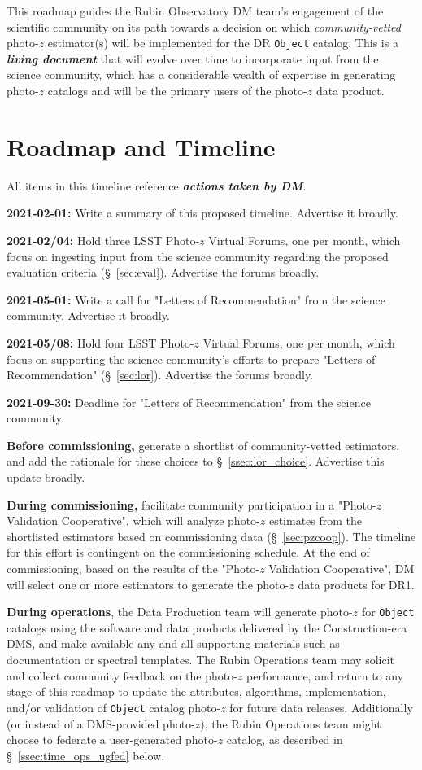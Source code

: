 \documentclass[DM,authoryear,toc]{lsstdoc}
\begin{document}
This roadmap guides the Rubin Observatory DM team's engagement of the scientific community on its path towards a decision on which \textit{community-vetted} photo-$z$ estimator(s) will be implemented for the DR {\tt Object} catalog.
This is a \textit{\textbf{living document}} that will evolve over time to incorporate input from the science community, which has a considerable wealth of expertise in generating photo-$z$ catalogs and will be the primary users of the photo-$z$ data product.


\section{Roadmap and Timeline}\label{sec:time}

All items in this timeline reference \textbf{\textit{actions taken by DM}}.

{\bf 2021-02-01:} Write a summary of this proposed timeline. Advertise it broadly.

{\bf 2021-02/04:} Hold three LSST Photo-$z$ Virtual Forums, one per month, which focus on ingesting input from the science community regarding the proposed evaluation criteria (\S~\ref{sec:eval}). Advertise the forums broadly.

{\bf 2021-05-01:} Write a call for "Letters of Recommendation" from the science community. Advertise it broadly.

{\bf 2021-05/08:} Hold four LSST Photo-$z$ Virtual Forums, one per month, which focus on supporting the science community's efforts to prepare "Letters of Recommendation" (\S~\ref{sec:lor}). Advertise the forums broadly.

{\bf 2021-09-30:} Deadline for "Letters of Recommendation" from the science community.

{\bf Before commissioning,} generate a shortlist of community-vetted estimators, and add the rationale for these choices to \S~\ref{ssec:lor_choice}. Advertise this update broadly.

{\bf During commissioning,} facilitate community participation in a "Photo-$z$ Validation Cooperative", which will analyze photo-$z$ estimates from the shortlisted estimators based on commissioning data (\S~\ref{sec:pzcoop}).
The timeline for this effort is contingent on the commissioning schedule.
At the end of commissioning, based on the results of the "Photo-$z$ Validation Cooperative", DM will select one or more estimators to generate the photo-$z$ data products for DR1.

{\bf During operations}, the Data Production team will generate photo-$z$ for {\tt Object} catalogs using the software and data products delivered by the Construction-era DMS, and make available any and all supporting materials such as documentation or spectral templates.
The Rubin Operations team may solicit and collect community feedback on the photo-$z$ performance, and return to any stage of this roadmap to update the attributes, algorithms, implementation, and/or validation of {\tt Object} catalog photo-$z$ for future data releases.
Additionally (or instead of a DMS-provided photo-$z$), the Rubin Operations team might choose to federate a user-generated photo-$z$ catalog, as described in \S~\ref{ssec:time_ops_ugfed} below.
\end{document}
